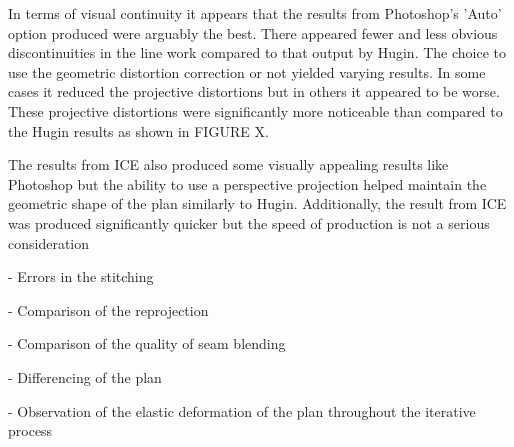 	In terms of visual continuity it appears that the results from Photoshop's 'Auto' option produced were arguably the best. There appeared fewer and less obvious discontinuities in the line work compared to that output by Hugin. The choice to use the geometric distortion correction or not yielded varying results. In some cases it reduced the projective distortions but in others it appeared to be worse. These projective distortions were significantly more noticeable than compared to the Hugin results as shown in FIGURE X.
	
	The results from ICE also produced some visually appealing results like Photoshop but the ability to use a perspective projection helped maintain the geometric shape of the plan similarly to Hugin. Additionally, the result from ICE was produced significantly quicker but the speed of production is not a serious consideration


- Errors in the stitching

- Comparison of the reprojection

- Comparison of the quality of seam blending

- Differencing of the plan

- Observation of the elastic deformation of the plan throughout the iterative process

